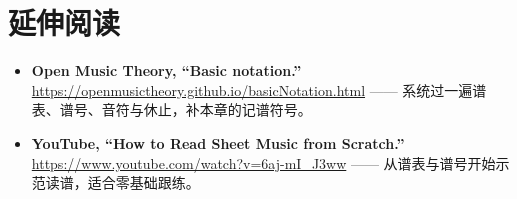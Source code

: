 \section*{延伸阅读}
\begin{itemize}
  \item \textbf{Open Music Theory, “Basic notation.”} \url{https://openmusictheory.github.io/basicNotation.html} —— 系统过一遍谱表、谱号、音符与休止，补本章的记谱符号。
  \item \textbf{YouTube, “How to Read Sheet Music from Scratch.”} \url{https://www.youtube.com/watch?v=6aj-mI_J3ww} —— 从谱表与谱号开始示范读谱，适合零基础跟练。
\end{itemize}

